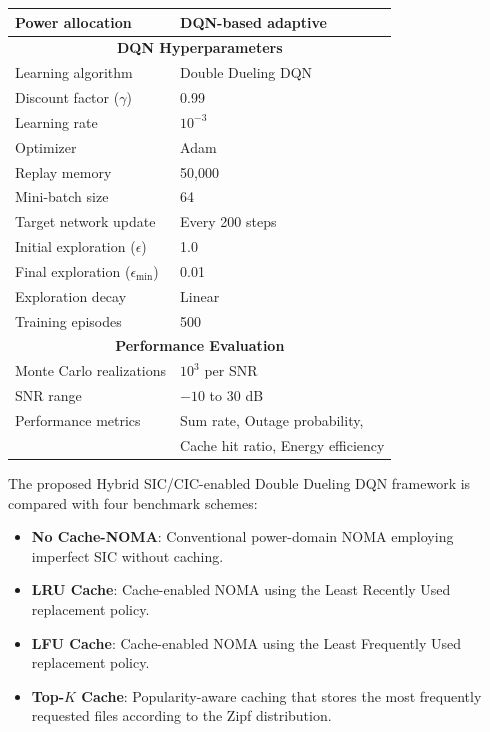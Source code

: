\documentclass[conference]{IEEEtran}
\begin{document}
\begin{table}[!t]
\begin{tabular}{ll}
Power allocation & DQN-based adaptive \\
\hline
\multicolumn{2}{c}{\textbf{DQN Hyperparameters}}\\
\hline
Learning algorithm & Double Dueling DQN \\
Discount factor ($\gamma$) & 0.99 \\
Learning rate & $10^{-3}$ \\
Optimizer & Adam \\
Replay memory & 50,000 \\
Mini-batch size & 64 \\
Target network update & Every 200 steps \\
Initial exploration ($\epsilon$) & 1.0 \\
Final exploration ($\epsilon_{\min}$) & 0.01 \\
Exploration decay & Linear \\
Training episodes & 500 \\
\hline
\multicolumn{2}{c}{\textbf{Performance Evaluation}}\\
\hline
Monte Carlo realizations & $10^{3}$ per SNR \\
SNR range & $-10$ to $30$ dB \\
Performance metrics &
Sum rate, Outage probability,\\
& Cache hit ratio, Energy efficiency \\
\hline
\end{tabular}
\end{table}

The proposed Hybrid SIC/CIC-enabled Double Dueling DQN framework is compared with four benchmark schemes:

\begin{itemize}

\item \textbf{No Cache-NOMA}: Conventional power-domain NOMA employing imperfect SIC without caching.

\item \textbf{LRU Cache}: Cache-enabled NOMA using the Least Recently Used replacement policy.

\item \textbf{LFU Cache}: Cache-enabled NOMA using the Least Frequently Used replacement policy.

\item \textbf{Top-$K$ Cache}: Popularity-aware caching that stores the most frequently requested files according to the Zipf distribution.

\end{itemize}
\end{document}
